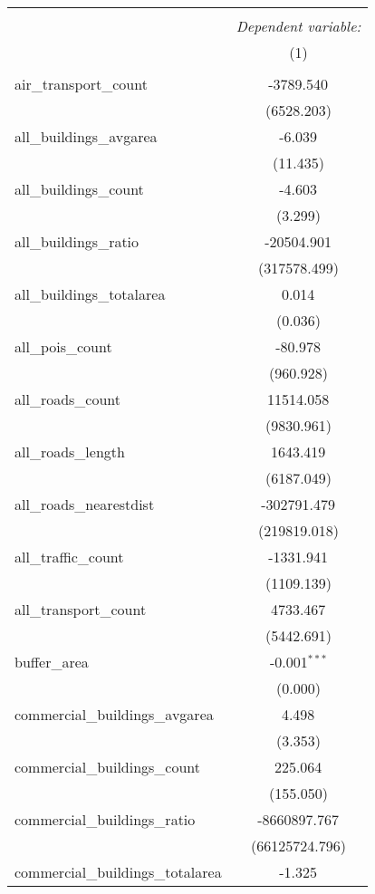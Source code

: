 \begin{table}[!htbp] \centering
\begin{tabular}{@{\extracolsep{5pt}}lc}
\\[-1.8ex]\hline
\hline \\[-1.8ex]
& \multicolumn{1}{c}{\textit{Dependent variable:}} \
\cr \cline{1-2}
\\[-1.8ex] & (1) \\
\hline \\[-1.8ex]
 air_transport_count & -3789.540$^{}$ \\
  & (6528.203) \\
 all_buildings_avgarea & -6.039$^{}$ \\
  & (11.435) \\
 all_buildings_count & -4.603$^{}$ \\
  & (3.299) \\
 all_buildings_ratio & -20504.901$^{}$ \\
  & (317578.499) \\
 all_buildings_totalarea & 0.014$^{}$ \\
  & (0.036) \\
 all_pois_count & -80.978$^{}$ \\
  & (960.928) \\
 all_roads_count & 11514.058$^{}$ \\
  & (9830.961) \\
 all_roads_length & 1643.419$^{}$ \\
  & (6187.049) \\
 all_roads_nearestdist & -302791.479$^{}$ \\
  & (219819.018) \\
 all_traffic_count & -1331.941$^{}$ \\
  & (1109.139) \\
 all_transport_count & 4733.467$^{}$ \\
  & (5442.691) \\
 buffer_area & -0.001$^{***}$ \\
  & (0.000) \\
 commercial_buildings_avgarea & 4.498$^{}$ \\
  & (3.353) \\
 commercial_buildings_count & 225.064$^{}$ \\
  & (155.050) \\
 commercial_buildings_ratio & -8660897.767$^{}$ \\
  & (66125724.796) \\
 commercial_buildings_totalarea & -1.325$^{}$ \\

\end{tabular}
\end{table}
